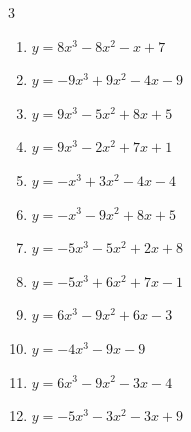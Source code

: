 \begin{multicols}{3}
\begin{enumerate}

  \item $y=8x^{3}-8x^{2}-x+7$


  \item $y=-9x^{3}+9x^{2}-4x-9$


  \item $y=9x^{3}-5x^{2}+8x+5$


  \item $y=9x^{3}-2x^{2}+7x+1$


  \item $y=-x^{3}+3x^{2}-4x-4$


\columnbreak %

  \item $y=-x^{3}-9x^{2}+8x+5$


  \item $y=-5x^{3}-5x^{2}+2x+8$


  \item $y=-5x^{3}+6x^{2}+7x-1$


  \item $y=6x^{3}-9x^{2}+6x-3$


  \item $y=-4x^{3}-9x-9$


  \item $y=6x^{3}-9x^{2}-3x-4$


  \item $y=-5x^{3}-3x^{2}-3x+9$



\end{enumerate}
\end{multicols}
